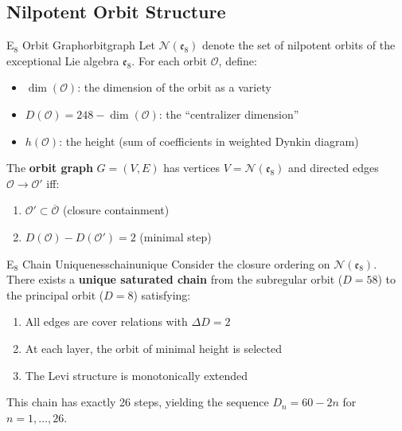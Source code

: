 \subsection{Nilpotent Orbit Structure}

\begin{definition}{E$_8$ Orbit Graph}{orbitgraph}
Let $\mathcal{N}(\mathfrak{e}_8)$ denote the set of nilpotent orbits of the 
exceptional Lie algebra $\mathfrak{e}_8$. For each orbit $\mathcal{O}$, define:
\begin{itemize}[leftmargin=1.5em, topsep=2pt, itemsep=1pt]
    \item $\dim(\mathcal{O})$: the dimension of the orbit as a variety
    \item $D(\mathcal{O}) = 248 - \dim(\mathcal{O})$: the ``centralizer dimension''
    \item $h(\mathcal{O})$: the height (sum of coefficients in weighted Dynkin diagram)
\end{itemize}
The \textbf{orbit graph} $G = (V, E)$ has vertices $V = \mathcal{N}(\mathfrak{e}_8)$ 
and directed edges $\mathcal{O} \to \mathcal{O}'$ iff:
\begin{enumerate}[leftmargin=1.5em, topsep=2pt, itemsep=1pt]
    \item $\mathcal{O}' \subset \overline{\mathcal{O}}$ (closure containment)
    \item $D(\mathcal{O}) - D(\mathcal{O}') = 2$ (minimal step)
\end{enumerate}
\end{definition}

\begin{theorem}{E$_8$ Chain Uniqueness}{chainunique}
Consider the closure ordering on $\mathcal{N}(\mathfrak{e}_8)$. There exists a 
\textbf{unique saturated chain} from the subregular orbit ($D = 58$) to the 
principal orbit ($D = 8$) satisfying:
\begin{enumerate}[leftmargin=1.5em, topsep=2pt, itemsep=1pt]
    \item All edges are cover relations with $\Delta D = 2$
    \item At each layer, the orbit of minimal height is selected
    \item The Levi structure is monotonically extended
\end{enumerate}
This chain has exactly 26 steps, yielding the sequence $D_n = 60 - 2n$ for $n = 1, \ldots, 26$.
\end{theorem}

